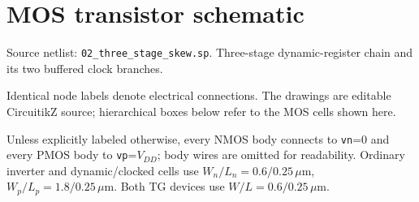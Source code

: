 \clearpage\section{MOS transistor schematic}
\begingroup\small
Source netlist: \texttt{02\_three\_stage\_skew.sp}. Three-stage dynamic-register chain and its two buffered clock branches.

Identical node labels denote electrical connections. The drawings are editable CircuitikZ source; hierarchical boxes below refer to the MOS cells shown here.

Unless explicitly labeled otherwise, every NMOS body connects to \texttt{vn}=0 and every PMOS body to \texttt{vp}=\(V_{DD}\); body wires are omitted for readability. Ordinary inverter and dynamic/clocked cells use \(W_n/L_n=0.6/0.25\,\mu\mathrm m\), \(W_p/L_p=1.8/0.25\,\mu\mathrm m\). Both TG devices use \(W/L=0.6/0.25\,\mu\mathrm m\). 

